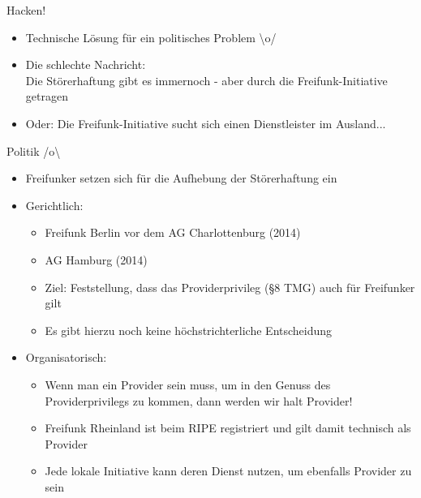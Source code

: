\documentclass[fleqn,11pt,aspectratio=169]{beamer}
\begin{document}
\begin{frame}{Hacken!}
\begin{itemize}
	\item Technische Lösung für ein politisches Problem \textbackslash o/
	\item Die schlechte Nachricht: \\Die Störerhaftung gibt es immernoch - aber durch die Freifunk-Initiative getragen
	\pause
	\item Oder: Die Freifunk-Initiative sucht sich einen Dienstleister im Ausland...
\end{itemize}
\end{frame}

\begin{frame}{Politik /o\textbackslash}
\begin{itemize}
	\item Freifunker setzen sich für die Aufhebung der Störerhaftung ein 
	\pause
	\item Gerichtlich:
	\begin{itemize}
		\item Freifunk Berlin vor dem AG Charlottenburg (2014)
		\item AG Hamburg (2014)
		\item Ziel: Feststellung, dass das Providerprivileg (§8 TMG) auch für Freifunker gilt
		\item Es gibt hierzu noch keine höchstrichterliche Entscheidung
	\end{itemize}
	\pause
	\item Organisatorisch:
	\begin{itemize}
		\item Wenn man ein Provider sein muss, um in den Genuss des Providerprivilegs zu kommen, dann werden wir halt Provider!
		\item Freifunk Rheinland ist beim RIPE registriert und gilt damit technisch als Provider 
		\item Jede lokale Initiative kann deren Dienst nutzen, um ebenfalls Provider zu sein
	\end{itemize}
\end{itemize}
\end{frame}
\end{document}
